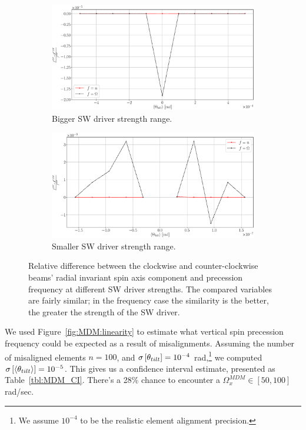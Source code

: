 \documentclass[preprint, review]{elsarticle}
\newcommand{\W}{\Omega}
\newcommand{\SD}[1]{\sigma\bkt*{#1}}
\newcommand{\avg}[1]{\langle{#1}\rangle}
\begin{document}
\begin{figure}[h]\centering
  \begin{subfigure}{\linewidth}
    \includegraphics[width=\linewidth]{img/fake_signal/linearity_test_shifting_gauss_rel_diff.eps}
    \caption{Bigger SW driver strength range.\label{fig:MDM:reldiff:SW_big}}
  \end{subfigure}
  \begin{subfigure}{\linewidth}
    \includegraphics[width=\linewidth]{img/fake_signal/linearity_test_compensated+microrad_rel_diff.eps}
    \caption{Smaller SW driver strength range.\label{fig:MDM:reldiff:SW_small}}
  \end{subfigure}
  \caption{Relative difference between the clockwise and counter-clockwise beams'
    radial invariant spin axis component and precession frequency at different SW driver strengths.
    The compared variables are fairly similar; in the frequency case the similarity is the better, the
    greater the strength of the SW driver.\label{fig:MDM:reldiff}
  }
\end{figure}

We used Figure~\ref{fig:MDM:linearity} to estimate what vertical spin precession frequency could be expected
as a result of misalignments. Assuming the number of misaligned elements $n=100$, and
$\SD{\theta_{tilt}} = 10^{-4}$ rad,\footnote{We assume $10^{-4}$ to be the realistic element alignment precision.}
we computed $\SD{\avg{\theta_{tilt}}} = 10^{-5}$. This gives us a confidence interval estimate,
presented as Table~\ref{tbl:MDM_CI}. There's a 28\% chance to encounter a $\W_x^{MDM}\in[50, 100]$ rad/sec.
\end{document}
